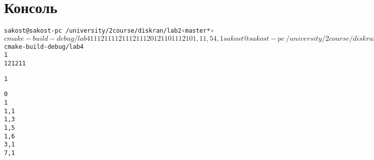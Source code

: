 \section{Консоль}
\begin{alltt}
	sakost@sakost-pc ~/university/2 course/diskran/lab2 ‹master*›$ cmake-build-debug/lab4
	1 1 1 2 1
	1 1 1 2 1 1 1 2 1
	1 1 2
	0 1 2 1 10
	1
	
	1
	
	

	1 2
	
	
	1
	0
	1, 1
	1, 5
	4, 1
	
	sakost@sakost-pc ~/university/2 course/diskran/lab2 ‹master*›$ cmake-build-debug/lab4
	1
	1 2 1 2 1 1
	
	1
	
	
	0
	1
	1, 1
	1, 3
	1, 5
	1, 6
	3, 1
	7, 1
\end{alltt}
\pagebreak


